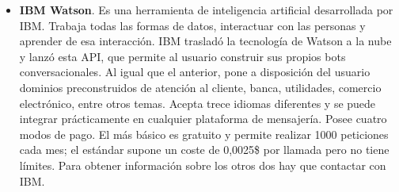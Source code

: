 \begin{itemize}
    \item \textbf{IBM Watson}. Es una herramienta de inteligencia artificial desarrollada por IBM. Trabaja todas las formas de datos, interactuar con las personas y aprender de esa interacción. IBM trasladó la tecnología de Watson a la nube y lanzó esta API, que permite al usuario construir sus propios bots conversacionales. Al igual que el anterior, pone a disposición del usuario dominios preconstruidos de atención al cliente, banca, utilidades, comercio electrónico, entre otros temas. Acepta trece idiomas diferentes y se puede integrar prácticamente en cualquier plataforma de mensajería. Posee cuatro modos de pago. El más básico es gratuito y permite realizar 1000 peticiones cada mes; el estándar supone un coste de 0,0025\$ por llamada pero no tiene límites. Para obtener información sobre los otros dos hay que contactar con IBM.
    
\end{itemize}